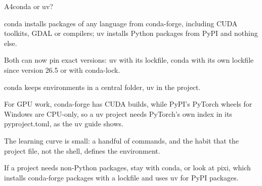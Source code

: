 \begin{frame}[source={conda (2026) · Astral (2026), uv: PyTorch integration · prefix.dev (2026), pixi}]{A4\enspace conda or uv?}
{    conda installs packages of any language from conda-forge, including CUDA toolkits, GDAL or
      compilers; uv installs Python packages from PyPI and nothing else.\par
    Both can now pin exact versions: uv with its lockfile, conda with its own lockfile since
      version 26.5 or with conda-lock.\par
    conda keeps environments in a central folder, uv in the project.\par
    For GPU work, conda-forge has CUDA builds, while PyPI's PyTorch wheels for Windows are
      CPU-only, so a uv project needs PyTorch's own index in its pyproject.toml, as the uv guide
      shows.\par
    The learning curve is small: a handful of commands, and the habit that the project file, not
      the shell, defines the environment.\par
    If a project needs non-Python packages, stay with conda, or look at pixi, which installs
      conda-forge packages with a lockfile and uses uv for PyPI packages.}
\end{frame}

